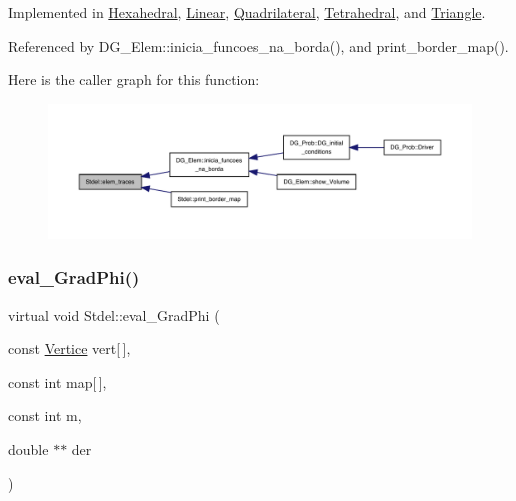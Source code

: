 Implemented in \hyperlink{classHexahedral_a795f04a1d90b00114cc30a26355a6e9b}{Hexahedral}, \hyperlink{classLinear_a3d3eea37a4e7b5a4af20a70f8100e779}{Linear}, \hyperlink{classQuadrilateral_a468bd309dfdd1efdb7e58eb795554f0d}{Quadrilateral}, \hyperlink{classTetrahedral_a0b01268d3cfcab8cb07ab3ed9d21c111}{Tetrahedral}, and \hyperlink{classTriangle_ad27047d488aa9454fb5dbce44493bc52}{Triangle}.



Referenced by D\+G\+\_\+\+Elem\+::inicia\+\_\+funcoes\+\_\+na\+\_\+borda(), and print\+\_\+border\+\_\+map().

Here is the caller graph for this function\+:
\nopagebreak
\begin{figure}[H]
\begin{center}
\leavevmode
\includegraphics[width=350pt]{classStdel_a3d72869352a2ff5eeb23972eca3b391e_icgraph}
\end{center}
\end{figure}
\mbox{\label{classStdel_a83a7a53e4be6da7c3a615967e4504b07}} 
\subsubsection{\texorpdfstring{eval\+\_\+\+Grad\+Phi()}{eval\_GradPhi()}}
{\footnotesize\ttfamily virtual void Stdel\+::eval\+\_\+\+Grad\+Phi (\begin{DoxyParamCaption}\item[{const \hyperlink{structVertice}{Vertice}}]{vert\mbox{[}$\,$\mbox{]},  }\item[{const int}]{map\mbox{[}$\,$\mbox{]},  }\item[{const int}]{m,  }\item[{double $\ast$$\ast$}]{der }\end{DoxyParamCaption})\hspace{0.3cm}{\ttfamily [pure virtual]}}




